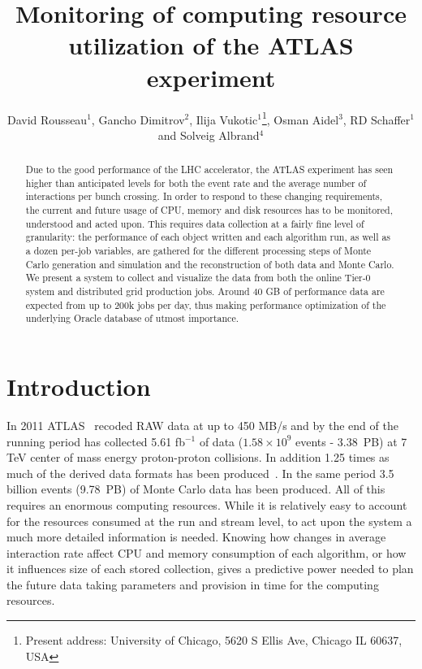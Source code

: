 \documentclass[a4paper]{jpconf}
\begin{document}
\title{Monitoring of computing resource utilization of the ATLAS experiment}

\author{David Rousseau$^1$, Gancho Dimitrov$^2$, Ilija Vukotic$^1$\footnote[4]{Present address:
University of Chicago, 5620 S Ellis Ave, Chicago IL 60637, USA}, Osman Aidel$^3$, RD Schaffer$^1$ and Solveig Albrand$^4$}

\address{$^1$ LAL, Univ. Paris-Sud and CNRS/IN2P3, Orsay, France}
\address{$^2$ CERN, Geneva, Switzerland}
\address{$^3$ Domaine scientifique de la Doua, Centre de Calcul CNRS/IN2P3, Villeurbanne Cedex, France}
\address{$^4$ Laboratoire de Physique Subatomique et de Cosmologie, Universit́e Joseph Fourier and CNRS/IN2P3 and Institut National Polytechnique de Grenoble}


\begin{abstract}
  Due to the good performance of the LHC accelerator, the ATLAS experiment has seen higher than anticipated levels for both the event rate and the average number of interactions per bunch crossing. In order to respond to these changing requirements, the current and future usage of CPU, memory and disk resources has to be monitored, understood and acted upon. This requires data collection at a fairly fine level of granularity: the performance of each object written and each algorithm run, as well as a dozen per-job variables, are gathered for the different processing steps of Monte Carlo generation and simulation and the reconstruction of both data and Monte Carlo. We present a system to collect and visualize the data from both the online Tier-0 system and distributed grid production jobs. Around 40 GB of performance data are expected from up to 200k jobs per day, thus making performance optimization of the underlying Oracle database of utmost importance.
\end{abstract}

\section{Introduction}

In 2011 ATLAS~\cite{atlas} recoded RAW data at up to 450 MB/s and by the end of the running period has collected 5.61 fb$^{-1}$ of data ($1.58\times10^{9}$ events - 3.38~PB) at 7 TeV center of mass energy proton-proton collisions. In addition 1.25 times as much of the derived data formats has been produced~\cite{boris}. In the same period 3.5 billion events (9.78~PB) of Monte Carlo data has been produced. All of this requires an enormous computing resources. While it is relatively easy to account for the resources consumed at the run and stream level, to act upon the system a much more detailed information is needed. Knowing how changes in average interaction rate affect CPU and memory consumption of each algorithm, or how it influences size of each stored collection, gives a predictive power needed to plan the future data taking parameters and provision in time for the computing resources.
\end{document}
